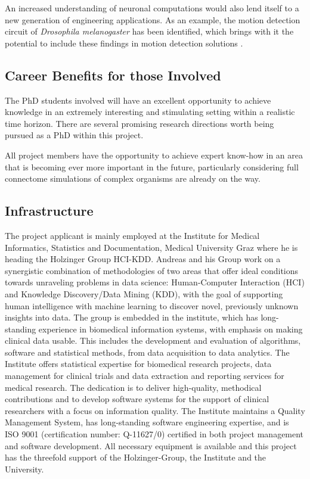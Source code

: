 \documentclass[a4paper,11pt]{article}
\begin{document}
An increased understanding of neuronal computations would also lend itself to a new generation of engineering applications. As an example, the motion detection circuit of \emph{Drosophila melanogaster} has been identified, which brings with it the potential to include these findings in motion detection solutions \citep{Takemura2013}.


\subsection{Career Benefits for those Involved}

The PhD students involved will have an excellent opportunity to achieve knowledge in an extremely interesting and stimulating setting within a realistic time horizon. There are several promising research directions worth being pursued as a PhD within this project. 

All project members have the opportunity to achieve expert know-how in an area that is becoming ever more important in the future, particularly considering full connectome simulations of complex organisms are already on the way.


\subsection{Infrastructure}

The project applicant is mainly employed at the Institute for Medical Informatics, Statistics and Documentation, Medical University Graz where he is heading the Holzinger Group HCI-KDD. Andreas and his Group work on a synergistic combination of methodologies of two areas that offer ideal conditions towards unraveling problems in data science: Human-Computer Interaction (HCI) and Knowledge Discovery/Data Mining (KDD), with the goal of supporting human intelligence with machine learning to discover novel, previously unknown insights into data. The group is embedded in the institute, which has long-standing experience in biomedical information systems, with emphasis on making clinical data usable. This includes the development and evaluation of algorithms, software and statistical methods, from data acquisition to data analytics. The Institute offers statistical expertise for biomedical research projects, data management for clinical trials and data extraction and reporting services for medical research. The dedication is to deliver high-quality, methodical contributions and to develop software systems for the support of clinical researchers with a focus on information quality. The Institute maintains a Quality Management System, has long-standing software engineering expertise, and is ISO 9001 (certification number: Q-11627/0) certified in both project management and software development. All necessary equipment is available and this project has the threefold support of the Holzinger-Group, the Institute and the University.
\end{document}
